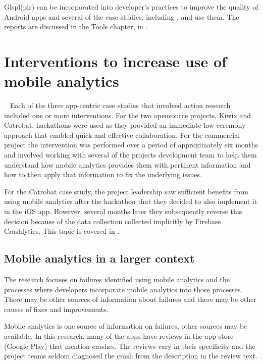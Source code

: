 Glspl(plr) can be incorporated into developer's practices to improve the quality of Android apps and several of the case studies, including ,  and  use them. The reports are discussed in the Tools chapter, in .


\section{Interventions to increase use of mobile analytics}~\label{aiu-interventions-theme}
Each of the three app-centric case studies that involved action research included one or more interventions. For the two opensource projects, Kiwix and Catrobat, hackathons were used as they provided an immediate low-ceremony approach that enabled quick and effective collaboration. For the commercial project the intervention was performed over a period of approximately six months and involved working with several of the projects development team to help them understand how mobile analytics provides them with pertinent information and how to then apply that information to fix the underlying issues. 

For the Catrobat case study, the project leadership saw sufficient benefits from using mobile analytics after the hackathon that they decided to also implement it in the iOS app. However, several months later they subsequently reverse this decision because of the data collection collected implicitly by Firebase Crashlytics. This topic is covered in .


\subsection{Mobile analytics in a larger context}
The research focuses on failures identified using mobile analytics and the processes where developers incorporate mobile analytics into those processes. There may be other sources of information about failures and there may be other causes of fixes and improvements.

Mobile analytics is one source of information on failures, other sources may be available. In this research, many of the apps have reviews in the app store (Google Play) that mention crashes. The reviews vary in their specificity and the project teams seldom diagnosed the crash from the description in the review text.   

